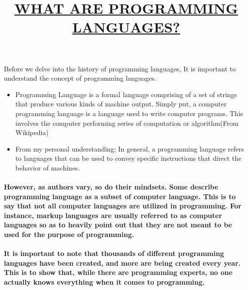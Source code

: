 \documentclass{article}
\begin{document}
 \title{\underline{\textbf{WHAT ARE PROGRAMMING LANGUAGES?}}}
 \maketitle
 Before we delve into the history of programming languages, It is important to understand the concept of programming languages.
 \begin{itemize}
 \item Programming Language is a formal language comprising of a set of strings that produce various kinds of machine output. Simply put, a computer programming language is a language used to write computer programs. This involves the computer performing series of computation or algorithm(From Wikipedia) 
 \item From my personal understanding;  In general, a programming language refers to languages that can be used to convey specific instructions that direct the behavior of machines.
\end{itemize} 
 \paragraph{However, as authors vary, so do their mindsets. Some describe programming language as a subset of computer language. This is to say that not all computer languages are utilized in programming. For instance, markup languages are usually referred to as computer languages so as to heavily point out that they are not meant to be used for the purpose of programming.}
 \paragraph{It is important to note that thousands of different programming languages have been created, and more are being created every year. This is to show that, while there are programming experts, no one actually knows everything when it comes to programming.}
 
 
\end{document}

